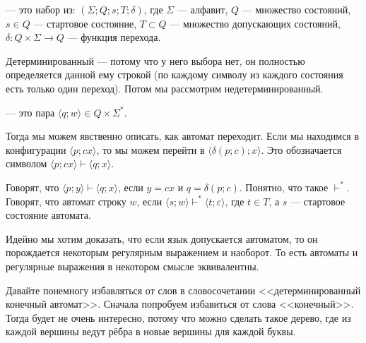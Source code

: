 \documentclass{article}
\begin{document}
\begin{itemize}
\begin{Example}
\begin{figure}[H]
            \end{figure}\noindent
        \end{Example}
        \dfn {} --- это набор из: $(\Sigma;Q;s;T;\delta)$, где $\Sigma$ --- алфавит, $Q$ --- множество состояний, $s\in Q$ --- стартовое состояние, $T\subset Q$ --- множество допускающих состояний, $\delta\colon Q\times\Sigma\to Q$ --- функция перехода.
        \begin{Comment}
            Детерминированный --- потому что у него выбора нет, он полностью определяется данной ему строкой (по каждому символу из каждого состояния есть только один переход). Потом мы рассмотрим недетерминированный.
        \end{Comment}
        \dfn {} --- это пара $\langle q;w\rangle\in Q\times\Sigma^*$.
        \begin{Comment}
            Тогда мы можем явственно описать, как автомат переходит. Если мы находимся в конфигурации $\langle p;cx\rangle$, то мы можем перейти в $\langle \delta(p;c);x\rangle$. Это обозначается символом $\langle p;cx\rangle\vdash\langle q;x\rangle$.
        \end{Comment}
        \dfn Говорят, что $\langle p;y\rangle\vdash\langle q;x\rangle$, если $y=cx$ и $q=\delta(p;c)$.
        \dfn Понятно, что такое $\vdash^*$.
        \dfn Говорят, что автомат  строку $w$, если $\langle s;w\rangle\vdash^*\langle t;\varepsilon\rangle$, где $t\in T$, а $s$ --- стартовое состояние автомата.
        \begin{Comment}
            Идейно мы хотим доказать, что если язык допускается автоматом, то он порождается некоторым регулярным выражением и наоборот. То есть автоматы и регулярные выражения в некотором смысле эквивалентны.
        \end{Comment}
        \begin{Comment}
            Давайте понемногу избавляться от слов в словосочетании <<детерминированный конечный автомат>>. Сначала попробуем избавиться от слова <<конечный>>. Тогда будет не очень интересно, потому что можно сделать такое дерево, где из каждой вершины ведут рёбра в новые вершины для каждой буквы.

\end{Comment}
\end{itemize}
\end{document}

